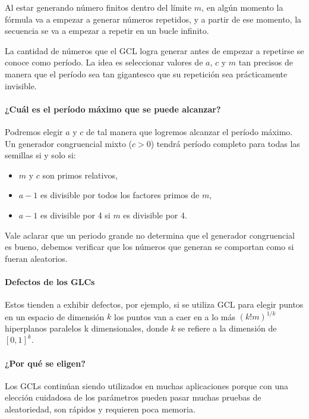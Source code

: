 \documentclass{article}
\begin{document}
Al estar generando número finitos dentro del límite $m$, en algún momento la fórmula va a empezar a generar números repetidos, y a partir de ese momento, la secuencia se va a empezar a repetir en un bucle infinito.

La cantidad de números que el GCL logra generar antes de empezar a repetirse se conoce como período. La idea es seleccionar valores de $a$, $c$ y $m$ tan precisos de manera que el período sea tan gigantesco que su repetición sea prácticamente invisible.

\paragraph{¿Cuál es el período máximo que se puede alcanzar?} Podremos elegir $a$ y $c$ de tal manera que logremos alcanzar el período máximo. Un generador congruencial mixto ($c > 0$) tendrá período completo para todas las semillas si y solo si:

\begin{itemize}
  \item $m$ y $c$ son primos relativos,
  \item $a-1$ es divisible por todos los factores primos de $m$,
  \item $a-1$ es divisible por 4 si $m$ es divisible por 4.
\end{itemize}

Vale aclarar que un periodo grande no determina que el generador congruencial es bueno, debemos verificar que los números que generan se comportan como si fueran aleatorios.

\paragraph{Defectos de los GLCs}

Estos tienden a exhibir defectos, por ejemplo, si se utiliza GCL para elegir puntos en un espacio de dimensión $k$ los puntos van a caer en a lo más $(k! m)^{1/k}$ hiperplanos paralelos k dimensionales, donde $k$ se refiere a la dimensión de $[0,1]^k$.

\paragraph{¿Por qué se eligen?}

Los GCLs continúan siendo utilizados en muchas aplicaciones porque con una elección cuidadosa de los parámetros pueden pasar muchas pruebas de aleatoriedad, son rápidos y requieren poca memoria.
\end{document}

